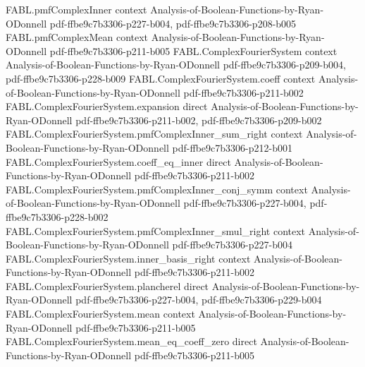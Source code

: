 \begin{theorem}
\label{FABL.ComplexFourierSystem.variance_eq_sum_coeff}
\leanok
{}
\proofstep
  {FABL.pmfComplexInner}
  {context}
  {Analysis-of-Boolean-Functions-by-Ryan-ODonnell}
  {pdf-ffbe9c7b3306-p227-b004,
    pdf-ffbe9c7b3306-p208-b005}
\proofstep
  {FABL.pmfComplexMean}
  {context}
  {Analysis-of-Boolean-Functions-by-Ryan-ODonnell}
  {pdf-ffbe9c7b3306-p211-b005}
\proofstep
  {FABL.ComplexFourierSystem}
  {context}
  {Analysis-of-Boolean-Functions-by-Ryan-ODonnell}
  {pdf-ffbe9c7b3306-p209-b004,
    pdf-ffbe9c7b3306-p228-b009}
\proofstep
  {FABL.ComplexFourierSystem.coeff}
  {context}
  {Analysis-of-Boolean-Functions-by-Ryan-ODonnell}
  {pdf-ffbe9c7b3306-p211-b002}
\proofstep
  {FABL.ComplexFourierSystem.expansion}
  {direct}
  {Analysis-of-Boolean-Functions-by-Ryan-ODonnell}
  {pdf-ffbe9c7b3306-p211-b002,
    pdf-ffbe9c7b3306-p209-b002}
\proofstep
  {FABL.ComplexFourierSystem.pmfComplexInner_sum_right}
  {context}
  {Analysis-of-Boolean-Functions-by-Ryan-ODonnell}
  {pdf-ffbe9c7b3306-p212-b001}
\proofstep
  {FABL.ComplexFourierSystem.coeff_eq_inner}
  {direct}
  {Analysis-of-Boolean-Functions-by-Ryan-ODonnell}
  {pdf-ffbe9c7b3306-p211-b002}
\proofstep
  {FABL.ComplexFourierSystem.pmfComplexInner_conj_symm}
  {context}
  {Analysis-of-Boolean-Functions-by-Ryan-ODonnell}
  {pdf-ffbe9c7b3306-p227-b004,
    pdf-ffbe9c7b3306-p228-b002}
\proofstep
  {FABL.ComplexFourierSystem.pmfComplexInner_smul_right}
  {context}
  {Analysis-of-Boolean-Functions-by-Ryan-ODonnell}
  {pdf-ffbe9c7b3306-p227-b004}
\proofstep
  {FABL.ComplexFourierSystem.inner_basis_right}
  {context}
  {Analysis-of-Boolean-Functions-by-Ryan-ODonnell}
  {pdf-ffbe9c7b3306-p211-b002}
\proofstep
  {FABL.ComplexFourierSystem.plancherel}
  {direct}
  {Analysis-of-Boolean-Functions-by-Ryan-ODonnell}
  {pdf-ffbe9c7b3306-p227-b004,
    pdf-ffbe9c7b3306-p229-b004}
\proofstep
  {FABL.ComplexFourierSystem.mean}
  {context}
  {Analysis-of-Boolean-Functions-by-Ryan-ODonnell}
  {pdf-ffbe9c7b3306-p211-b005}
\proofstep
  {FABL.ComplexFourierSystem.mean_eq_coeff_zero}
  {direct}
  {Analysis-of-Boolean-Functions-by-Ryan-ODonnell}
  {pdf-ffbe9c7b3306-p211-b005}

\end{theorem}
